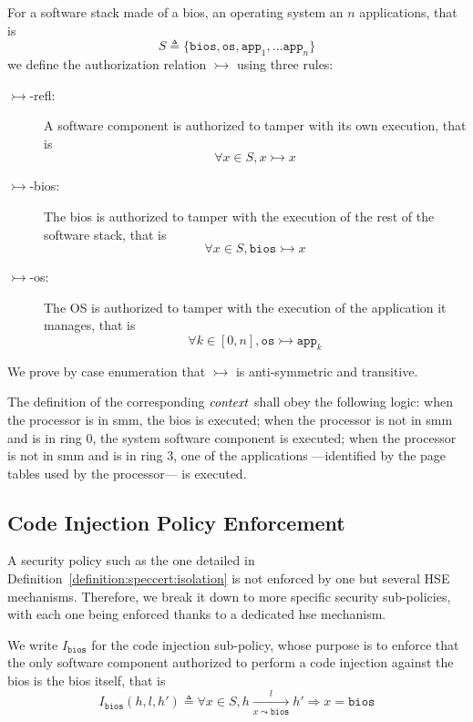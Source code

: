 \begin{definition}
  \label{definition:speccert:isolation}

  For a software stack made of a \ac{bios}, an operating system an \( n \)
  applications, that is
  \[
    S \triangleq \{ \mathtt{bios}, \mathtt{os}, \mathtt{app}_1, \dots
    \mathtt{app}_n \}
  \]
  we define the authorization relation $\rightarrowtail$ using three rules:
  \begin{description}
  \item [\(\rightarrowtail\)-refl:] A software component is authorized to tamper
    with its own execution, that is
    \[ \forall x \in S, x \rightarrowtail x \]
  \item [\(\rightarrowtail\)-bios:] The \ac{bios} is authorized to tamper with
    the execution of the rest of the software stack, that is
    \[ \forall x \in S, \mathtt{bios} \rightarrowtail x \]
  \item [\(\rightarrowtail\)-os:] The OS is authorized to tamper with the
    execution of the application it manages, that is
    \[ \forall k \in [0, n], \mathtt{os} \rightarrowtail \mathtt{app}_k \]
  \end{description}

  We prove by case enumeration that $\rightarrowtail$ is anti-symmetric and
  transitive.

  The definition of the corresponding $\mathit{context}$ shall obey the following
  logic: when the processor is in \ac{smm}, the \ac{bios} is executed; when the
  processor is not in \ac{smm} and is in ring 0, the system software component
  is executed; when the processor is not in \ac{smm} and is in ring 3, one of
  the applications ---identified by the page tables used by the processor--- is
  executed.
\end{definition}

\subsection{Code Injection Policy Enforcement}
\label{subsec:speccert:isolationenforcement}

A security policy such as the one detailed in
Definition~\ref{definition:speccert:isolation} is not enforced by one but
several HSE mechanisms.
%
Therefore, we break it down to more specific security sub-policies, with each
one being enforced thanks to a dedicated \ac{hse} mechanism.

\begin{definition}
  \label{def:speccert:biospol}

  We write $I_{\mathtt{bios}}$ for the code injection sub-policy, whose purpose
  is to enforce that the only software component authorized to perform a code
  injection against the \ac{bios} is the \ac{bios} itself, that is
  \[
    I_{\mathtt{bios}}(h, l, h') \triangleq \forall x \in S, h \xrightarrow[x
    \leadsto \mathtt{bios}]{l} h' \Rightarrow x = \mathtt{bios}
  \]
\end{definition}

